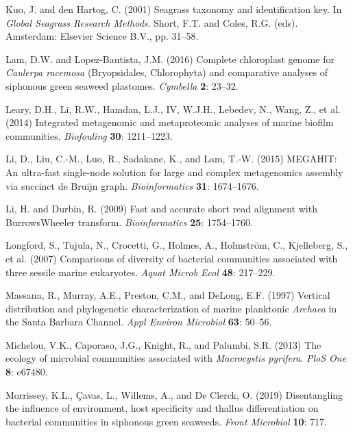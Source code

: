 \documentclass[
  12pt,
]{article}
\begin{document}
\leavevmode\hypertarget{ref-Kuo2001}{}%
Kuo, J. and den Hartog, C. (2001) Seagrass taxonomy and identification
key. In \emph{Global Seagrass Research Methods}. Short, F.T. and Coles,
R.G. (eds). Amsterdam: Elsevier Science B.V., pp. 31--58.

\leavevmode\hypertarget{ref-Lam2016}{}%
Lam, D.W. and Lopez-Bautista, J.M. (2016) Complete chloroplast genome
for \emph{Caulerpa racemosa} (Bryopsidales, Chlorophyta) and comparative
analyses of siphonous green seaweed plastomes. \emph{Cymbella}
\textbf{2}: 23--32.

\leavevmode\hypertarget{ref-Leary2014}{}%
Leary, D.H., Li, R.W., Hamdan, L.J., IV, W.J.H., Lebedev, N., Wang, Z.,
et al. (2014) Integrated metagenomic and metaproteomic analyses of
marine biofilm communities. \emph{Biofouling} \textbf{30}: 1211--1223.

\leavevmode\hypertarget{ref-Li2015}{}%
Li, D., Liu, C.-M., Luo, R., Sadakane, K., and Lam, T.-W. (2015)
MEGAHIT: An ultra-fast single-node solution for large and complex
metagenomics assembly via succinct de Bruijn graph.
\emph{Bioinformatics} \textbf{31}: 1674--1676.

\leavevmode\hypertarget{ref-Li2009a}{}%
Li, H. and Durbin, R. (2009) Fast and accurate short read alignment with
BurrowsWheeler transform. \emph{Bioinformatics} \textbf{25}: 1754--1760.

\leavevmode\hypertarget{ref-Longford2007}{}%
Longford, S., Tujula, N., Crocetti, G., Holmes, A., Holmström, C.,
Kjelleberg, S., et al. (2007) Comparisons of diversity of bacterial
communities associated with three sessile marine eukaryotes. \emph{Aquat
Microb Ecol} \textbf{48}: 217--229.

\leavevmode\hypertarget{ref-Massana1997}{}%
Massana, R., Murray, A.E., Preston, C.M., and DeLong, E.F. (1997)
Vertical distribution and phylogenetic characterization of marine
planktonic \emph{Archaea} in the Santa Barbara Channel. \emph{Appl
Environ Microbiol} \textbf{63}: 50--56.

\leavevmode\hypertarget{ref-Michelou2013}{}%
Michelou, V.K., Caporaso, J.G., Knight, R., and Palumbi, S.R. (2013) The
ecology of microbial communities associated with \emph{Macrocystis
pyrifera}. \emph{PloS One} \textbf{8}: e67480.

\leavevmode\hypertarget{ref-Morrissey2019}{}%
Morrissey, K.L., Çavas, L., Willems, A., and De Clerck, O. (2019)
Disentangling the influence of environment, host specificity and thallus
differentiation on bacterial communities in siphonous green seaweeds.
\emph{Front Microbiol} \textbf{10}: 717.
\end{document}
